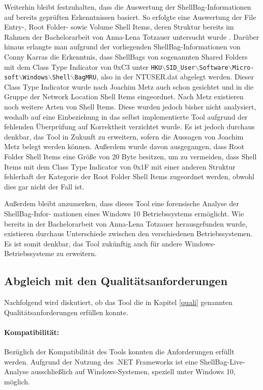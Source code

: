 Weiterhin bleibt festzuhalten, dass die Auswertung der ShellBag-Informationen auf bereits geprüften Erkenntnissen basiert. So erfolgte eine Auswertung der File Entry-, Root Folder- sowie Volume Shell Items, deren Struktur bereits im Rahmen der Bachelorarbeit von Anna-Lena Totzauer untersucht wurde \cite{ba}. Darüber hinaus erlangte man aufgrund der vorliegenden ShellBag-Informationen von Conny Karras die Erkenntnis, dass ShellBags von sogenannten Shared Folders mit dem Class Type Indicator von 0xC3 unter \texttt{HKU$\backslash$SID\_User$\backslash$Software$\backslash$Micro- \newline soft$\backslash$Windows$\backslash$Shell$\backslash$BagMRU}, also in der NTUSER.dat abgelegt werden. Dieser Class Type Indicator wurde nach Joachim Metz auch schon gesichtet und in die Gruppe der Network Location Shell Items eingeordnet. Nach Metz existieren noch weitere Arten von Shell Items. Diese wurden jedoch bisher nicht analysiert, weshalb auf eine Einbeziehung in das selbst implementierte Tool aufgrund der fehlenden Überprüfung auf Korrektheit verzichtet wurde. Es ist jedoch durchaus denkbar, das Tool in Zukunft zu erweitern, sofern die Aussagen von Joachim Metz belegt werden können. Außerdem wurde davon ausgegangen, dass Root Folder Shell Items eine Größe von 20 Byte besitzen, um zu vermeiden, dass Shell Items mit dem Class Type Indicator von 0x1F mit einer anderen Struktur fehlerhaft der Kategorie der Root Folder Shell Items zugeordnet werden, obwohl dies gar nicht der Fall ist. \cite{shelltype}

Außerdem bleibt anzumerken, dass dieses Tool eine forensische Analyse der ShellBag-Infor- \newline mationen eines Windows 10 Betriebssystems ermöglicht. Wie bereits in der Bachelorarbeit von Anna-Lena Totzauer herausgefunden wurde, existieren durchaus Unterschiede zwischen den verschiedenen Betriebssystemen. Es ist somit denkbar, das Tool zukünftig auch für andere Windows-Betriebssysteme zu erweitern. \cite{ba,lo2014windows}

\subsection{Abgleich mit den Qualitätsanforderungen}
\vspace{0.3cm}
Nachfolgend wird diskutiert, ob das Tool die in Kapitel \ref{quali} genannten Qualitätsanforderungen erfüllen konnte.

\paragraph{Kompatibilität:}
Bezüglich der Kompatibilität des Tools konnten die Anforderungen erfüllt werden. Aufgrund der Nutzung des .NET Frameworks ist eine ShellBag-Live-Analyse ausschließlich auf Windows-Systemen, speziell unter Windows 10, möglich.

